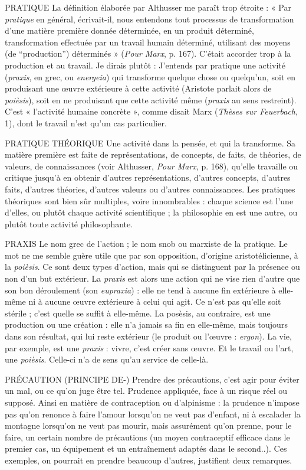 PRATIQUE La définition élaborée par Althusser me paraît trop étroite :
« Par {\it pratique} en général, écrivait-il, nous entendons tout processus
de transformation d’une matière première donnée déterminée, en un
produit déterminé, transformation effectuée par un travail humain déterminé,
utilisant des moyens (de “production”) déterminés » ({\it Pour Marx}, p. 167).
C'était accorder trop à la production et au travail. Je dirais plutôt : J'entends
par pratique une activité ({\it praxis}, en grec, ou {\it energeia}) qui transforme quelque
chose ou quelqu'un, soit en produisant une œuvre extérieure à cette activité
(Aristote parlait alors de {\it poièsis}), soit en ne produisant que cette activité même
({\it praxis} au sens restreint). C’est « l’activité humaine concrète », comme disait
Marx ({\it Thèses sur Feuerbach}, 1), dont le travail n’est qu’un cas particulier.

PRATIQUE THÉORIQUE Une activité dans la pensée, et qui la transforme.
Sa matière première est faite de représentations,
de concepts, de faits, de théories, de valeurs, de connaissances (voir
Althusser, {\it Pour Marx}, p. 168), qu’elle travaille ou critique jusqu’à en obtenir
d’autres représentations, d’autres concepts, d’autres faits, d’autres théories,
d’autres valeurs ou d’autres connaissances. Les pratiques théoriques sont bien
sûr multiples, voire innombrables : chaque science est l’une d’elles, ou plutôt
chaque activité scientifique ; la philosophie en est une autre, ou plutôt toute
activité philosophante.

PRAXIS Le nom grec de l’action ; le nom snob ou marxiste de la pratique.
Le mot ne me semble guère utile que par son opposition, d’origine
aristotélicienne, à la {\it poièsis}. Ce sont deux types d’action, mais qui se distinguent
par la présence ou non d’un but extérieur. La {\it praxis} est alors une action
qui ne vise rien d’autre que son bon déroulement (son {\it eupraxia}) : elle ne tend
à aucune fin extérieure à elle-même ni à aucune œuvre extérieure à celui qui
agit. Ce n’est pas qu’elle soit stérile ; c’est quelle se suffit à elle-même. La posèsis,
au contraire, est une production ou une création : elle n’a jamais sa fin en elle-même,
mais toujours dans son résultat, qui lui reste extérieur (le produit ou
l’œuvre : {\it ergon}). La vie, par exemple, est une {\it praxis} : vivre, c’est créer sans
œuvre. Et le travail ou l’art, une {\it poièsis}. Celle-ci n’a de sens qu’au service de
celle-là.

PRÉCAUTION (PRINCIPE DE-) Prendre des précautions, c’est agir pour
éviter un mal, ou ce qu’on juge être tel.
Prudence appliquée, face à un risque réel ou supposé. Ainsi en matière de
contraception ou d’alpinisme : la prudence n’impose pas qu’on renonce à faire
l'amour lorsqu'on ne veut pas d’enfant, ni à escalader la montagne lorsqu'on ne
veut pas mourir, mais assurément qu'on prenne, pour le faire, un certain
nombre de précautions (un moyen contraceptif efficace dans le premier cas, un
équipement et un entraînement adaptés dans le second..). Ces exemples, on
pourrait en prendre beaucoup d’autres, justifient deux remarques.

